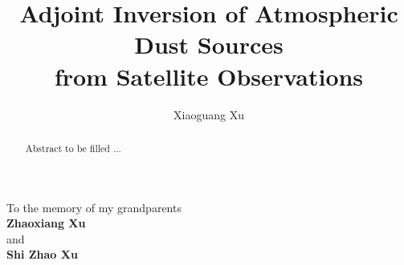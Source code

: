 \documentclass[phd, print]{nuthesis}
\begin{document}
\frontmatter

\title{Adjoint Inversion of Atmospheric Dust Sources  \\ from Satellite Observations}
\author{Xiaoguang Xu}
\maketitle
\begin{abstract}
  Abstract to be filled ...
\end{abstract}


\begin{dedication}
  \begin{center}
  \vskip1in
  To the memory of my grandparents \\
  \vskip0.2in
  \textbf{Zhaoxiang Xu} \\
  and  \\
  \textbf{Shi Zhao Xu}
  \end{center}
\end{dedication}
\end{document}
